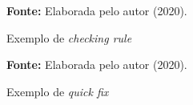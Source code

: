 \begin{figure}[ht!]
\centering

\caption{\textmd{Exemplo de \textit{checking rule}}}
\label{fig:checkingrule}

\par\medskip\textbf{Fonte:} Elaborada pelo autor (2020). \par\medskip

\end{figure}


\begin{figure}[ht!]
\centering

\caption{\textmd{Exemplo de \textit{quick fix}}}
\label{fig:quickfix}

\par\medskip\textbf{Fonte:} Elaborada pelo autor (2020). \par\medskip

\end{figure}

